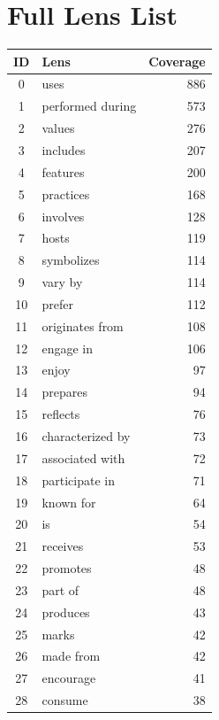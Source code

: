 \documentclass[11pt]{article}
\begin{document}
\appendix

\section{Full Lens List}
\label{app:lenses}

\begin{table}[h]
\centering
\small
\begin{tabular}{clr}
\toprule
\textbf{ID} & \textbf{Lens} & \textbf{Coverage} \\
\midrule
0  & uses              & 886 \\
1  & performed during  & 573 \\
2  & values            & 276 \\
3  & includes          & 207 \\
4  & features          & 200 \\
5  & practices         & 168 \\
6  & involves          & 128 \\
7  & hosts             & 119 \\
8  & symbolizes        & 114 \\
9  & vary by           & 114 \\
10 & prefer            & 112 \\
11 & originates from   & 108 \\
12 & engage in         & 106 \\
13 & enjoy             & 97  \\
14 & prepares          & 94  \\
15 & reflects          & 76  \\
16 & characterized by  & 73  \\
17 & associated with   & 72  \\
18 & participate in    & 71  \\
19 & known for         & 64  \\
20 & is                & 54  \\
21 & receives          & 53  \\
22 & promotes          & 48  \\
23 & part of           & 48  \\
24 & produces          & 43  \\
25 & marks             & 42  \\
26 & made from         & 42  \\
27 & encourage         & 41  \\
28 & consume           & 38  \\

\end{tabular}
\end{table}
\end{document}
